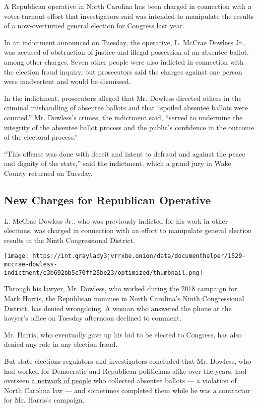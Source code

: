 A Republican operative in North Carolina has been charged in connection
with a voter-turnout effort that investigators said was intended to
manipulate the results of a now-overturned general election for Congress
last year.

In an indictment announced on Tuesday, the operative, L. McCrae Dowless
Jr., was accused of obstruction of justice and illegal possession of an
absentee ballot, among other charges. Seven other people were also
indicted in connection with the election fraud inquiry, but prosecutors
said the charges against one person were inadvertent and would be
dismissed.

In the indictment, prosecutors alleged that Mr. Dowless directed others
in the criminal mishandling of absentee ballots and that ``spoiled
absentee ballots were counted.'' Mr. Dowless's crimes, the indictment
said, ``served to undermine the integrity of the absentee ballot process
and the public's confidence in the outcome of the electoral process.''

``This offense was done with deceit and intent to defraud and against
the peace and dignity of the state,'' said the indictment, which a grand
jury in Wake County returned on Tuesday.

\hypertarget{new-charges-for-republican-operative}{%
\subsection{New Charges for Republican
Operative}\label{new-charges-for-republican-operative}}

L. McCrae Dowless Jr., who was previously indicted for his work in other
elections, was charged in connection with an effort to manipulate
general election results in the Ninth Congressional District.

\texttt{[image: https://int.graylady3jvrrxbe.onion/data/documenthelper/1529-mccrae-dowless-indictment/e3b692bb5c70ff25be23/optimized/thumbnail.png]}

Through his lawyer, Mr. Dowless, who worked during the 2018 campaign for
Mark Harris, the Republican nominee in North Carolina's Ninth
Congressional District, has denied wrongdoing. A woman who answered the
phone at the lawyer's office on Tuesday afternoon declined to comment.

Mr. Harris, who eventually gave up his bid to be elected to Congress,
has also denied any role in any election fraud.

But state elections regulators and investigators concluded that Mr.
Dowless, who had worked for Democratic and Republican politicians alike
over the years, had overseen
\href{https://www.nytimes3xbfgragh.onion/2019/02/20/us/north-carolina-voter-fraud.html}{a
network of people} who collected absentee ballots --- a violation of
North Carolina law --- and sometimes completed them while he was a
contractor for Mr. Harris's campaign.

